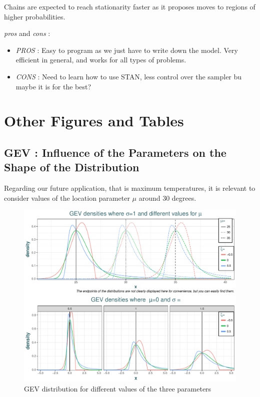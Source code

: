 Chains are expected to reach stationarity faster as it proposes moves to regions of higher probabilities.


\emph{pros} and \emph{cons} : 

\begin{itemize}
	\item \emph{PROS} : Easy to program as we just have to write down the model. Very efficient in general, and works for all types of problems.
	\item \emph{CONS} : Need to learn how to use STAN, less control over the sampler bu maybe it is for the best?
\end{itemize}


\chapter{Other Figures and Tables}\label{app:fig}

\section{GEV : Influence of the Parameters on the Shape of the Distribution}

Regarding our future application, that is maximum temperatures, it is relevant to consider values of the location parameter $\mu$ around 30 degrees. 


\begin{figure}[!htb]
	\includegraphics[width=\linewidth]{gevdif.pdf}\caption{GEV distribution for different values of the three parameters }\label{fig:gevdif}
\end{figure}


